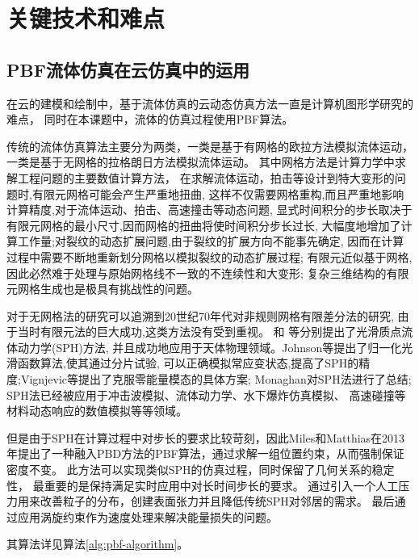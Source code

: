 \chapter{关键技术和难点}
\label{chap:keytechnology}


\section{PBF流体仿真在云仿真中的运用}
\label{sec:fulid-simulation}
在云的建模和绘制中，基于流体仿真的云动态仿真方法一直是计算机图形学研究的难点，
同时在本课题中，流体的仿真过程使用PBF算法。


传统的流体仿真算法主要分为两类，一类是基于有网格的欧拉方法模拟流体运动，
一类是基于无网格的拉格朗日方法模拟流体运动。
其中网格方法是计算力学中求解工程问题的主要数值计算方法，
在求解流体运动，拍击等设计到特大变形的问题时,有限元网格可能会产生严重地扭曲,
这样不仅需要网格重构,而且严重地影响计算精度,对于流体运动、拍击、高速撞击等动态问题,
显式时间积分的步长取决于有限元网格的最小尺寸,因而网格的扭曲将使时间积分步长过长,
大幅度地增加了计算工作量;对裂纹的动态扩展问题,由于裂纹的扩展方向不能事先确定,
因而在计算过程中需要不断地重新划分网格以模拟裂纹的动态扩展过程;
有限元近似基于网格,因此必然难于处理与原始网格线不一致的不连续性和大变形;
复杂三维结构的有限元网格生成也是极具有挑战性的问题。

对于无网格法的研究可以追溯到20世纪70年代对非规则网格有限差分法的研究,
由于当时有限元法的巨大成功,这类方法没有受到重视。
\citeauthor{Lucy1977A}和\citeauthor{Gingold1977Smoothed}
等分别提出了光滑质点流体动力学(SPH)方法,
并且成功地应用于天体物理领域。Johnson等提出了归一化光滑函数算法,使其通过分片试验,
可以正确模拟常应变状态,提高了SPH的精度;Vignjevic等提出了克服零能量模态的具体方案;
Monaghan对SPH法进行了总结;
SPH法已经被应用于冲击波模拟、流体动力学、水下爆炸仿真模拟、
高速碰撞等材料动态响应的数值模拟等等领域。

但是由于SPH在计算过程中对步长的要求比较苛刻，因此Miles和Matthias在2013年提出了一种融入PBD方法的PBF算法，通过求解一组位置约束，从而强制保证密度不变。
此方法可以实现类似SPH的仿真过程，同时保留了几何关系的稳定性，
最重要的是保持满足实时应用中对长时间步长的要求。
通过引入一个人工压力用来改善粒子的分布，创建表面张力并且降低传统SPH对邻居的需求。
最后通过应用涡旋约束作为速度处理来解决能量损失的问题。

其算法详见算法\ref{alg:pbf-algorithm}。

